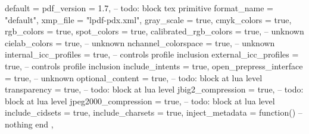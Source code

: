 %
default = {
        pdf_version             = 1.7,  -- todo: block tex primitive
        format_name             = "default",
        xmp_file                = "lpdf-pdx.xml",
        gray_scale              = true,
        cmyk_colors             = true,
        rgb_colors              = true,
        spot_colors             = true,
        calibrated_rgb_colors   = true, -- unknown
        cielab_colors           = true, -- unknown
        nchannel_colorspace     = true, -- unknown
        internal_icc_profiles   = true, -- controls profile inclusion
        external_icc_profiles   = true, -- controls profile inclusion
        include_intents         = true,
        open_prepress_interface = true, -- unknown
        optional_content        = true, -- todo: block at lua level
        transparency            = true, -- todo: block at lua level
        jbig2_compression       = true, -- todo: block at lua level
        jpeg2000_compression    = true, -- todo: block at lua level
        include_cidsets         = true,
        include_charsets        = true,
        inject_metadata         = function()
            -- nothing
        end
    },

